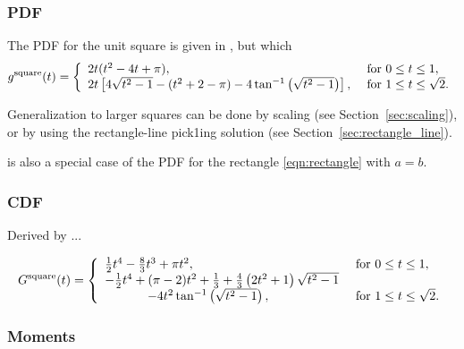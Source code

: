 \subsubsection{PDF}

The PDF for the unit square is given in
\cite{philip:_probab_distr_distan_between_two,weisstein:_squar_line_picking},
but which
\begin{equation}
  \label{eq:square_line}
  g^{\rm square}(t) = \left\{ \begin{array}{ll}
      2t (t^2-4t+\pi), & \mbox{ for } 0 \leq t \leq 1, \\
      2t \left[4 \sqrt{t^2-1} - (t^2+2-\pi) - 4 \tan^{-1} \left(\sqrt{t^2-1} \right)\right], 
               & \mbox{ for } 1 \leq t \leq \sqrt{2} . \\ 
    \end{array} \right.
\end{equation}

Generalization to larger squares can be done by scaling (see
Section~\ref{sec:scaling}), or by using the rectangle-line pick1ing
solution (see Section~\ref{sec:rectangle_line}).


 is also a special case of the PDF for the rectangle
\eqref{eqn:rectangle} with $a=b$.

\subsubsection{CDF}
Derived by ...

\begin{equation}
  \label{eq:square_cdf}
  G^{\rm square}(t) = \left\{ \begin{array}{ll}
      \frac{1}{2} t^4 - \frac{8}{3} t^3 + \pi t^2, 
               & \mbox{ for } 0 \leq t \leq 1, \\
      -\frac{1}{2} t^4 + (\pi-2)t^2 + \frac{1}{3}
                   +\frac{4}{3} \left( 2t^2+1 \right)\sqrt{t^2-1} 
                     & \\
                   \hspace{12mm} - 4 t^2 \tan^{-1} \left(\sqrt{t^2-1} \right),
               & \mbox{ for } 1 \leq t \leq \sqrt{2} . \\ 
    \end{array} \right.
\end{equation}

\subsubsection{Moments}




